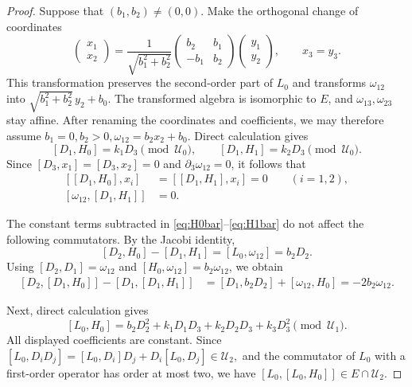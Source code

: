 \documentclass{tCON2e}
\newenvironment{revision}{\begingroup\color{black}}{\endgroup}
\numberwithin{equation}{section}
\theoremstyle{journalplain}
\theoremstyle{journaldef}
\newenvironment{revision}{}{}
\begin{document}
\begin{revision}
\begin{proof}
Suppose that $(b_1,b_2)\ne(0,0)$. Make the orthogonal change
of coordinates
\[
\begin{pmatrix}x_1\\x_2\end{pmatrix}
=
\frac{1}{\sqrt{b_1^2+b_2^2}}
\begin{pmatrix}b_2&b_1\\-b_1&b_2\end{pmatrix}
\begin{pmatrix}y_1\\y_2\end{pmatrix},
\qquad x_3=y_3.
\]
This transformation preserves the second-order
part of $L_0$ and transforms $\omega_{12}$ into
$\sqrt{b_1^2+b_2^2}\,y_2+b_0$.
The transformed algebra is isomorphic to $E$, and $\omega_{13},\omega_{23}$ stay affine.
After renaming the coordinates and coefficients, we may
therefore assume
\(
b_1=0,b_2>0,
\omega_{12}=b_2x_2+b_0.
\)
Direct calculation gives
\[
[D_1,H_0]=k_1D_3\pmod{\mathcal U_0},
\qquad
[D_1,H_1]=k_2D_3\pmod{\mathcal U_0}.
\]
Since $[D_3,x_1]=[D_3,x_2]=0$ and
$\partial_3\omega_{12}=0$, it follows that
\begin{equation}
\begin{aligned}
{}[[D_1,H_0],x_i]&=[[D_1,H_1],x_i]=0
\qquad(i=1,2),\\
[\omega_{12},[D_1,H_1]]&=0.
\end{aligned}
\label{eq:jacobi-vertical}
\end{equation}

The constant terms subtracted in
\eqref{eq:H0bar}--\eqref{eq:H1bar} do not affect the following
commutators. By the Jacobi identity,
\[
[D_2,H_0]-[D_1,H_1]
=[L_0,\omega_{12}]=b_2D_2.
\]
Using $[D_2,D_1]=\omega_{12}$ and
$[H_0,\omega_{12}]=b_2\omega_{12}$, we obtain
\begin{equation}
\begin{aligned}
{}[D_2,[D_1,H_0]]-[D_1,[D_1,H_1]]
&=[D_1,b_2D_2]+[\omega_{12},H_0]=-2b_2\omega_{12}.
\end{aligned}
\label{eq:jacobi-first-obstruction}
\end{equation}

Next, direct calculation gives
\[
[L_0,H_0]
=b_2D_2^2+k_1D_1D_3+k_2D_2D_3+k_3D_3^2
\pmod{\mathcal U_1}.
\]
All displayed coefficients are constant. Since
\(
[L_0,D_iD_j]
=[L_0,D_i]D_j+D_i[L_0,D_j]
\in\mathcal U_2,
\)
and the commutator of $L_0$ with a first-order operator
has order at most two, we have
\(
[L_0,[L_0,H_0]]\in E\cap\mathcal U_2.
\)


\end{proof}
\end{revision}
\end{document}
